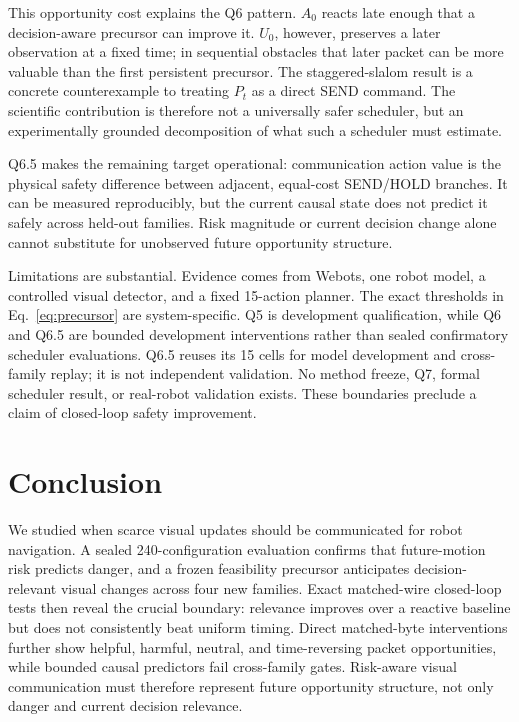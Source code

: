 \documentclass[letterpaper,10pt,conference]{ieeeconf}
\begin{document}
This opportunity cost explains the Q6 pattern. $A_0$ reacts late enough that a
decision-aware precursor can improve it. $U_0$, however, preserves a later
observation at a fixed time; in sequential obstacles that later packet can be
more valuable than the first persistent precursor. The staggered-slalom result
is a concrete counterexample to treating $P_t$ as a direct SEND command. The
scientific contribution is therefore not a universally safer scheduler, but an
experimentally grounded decomposition of what such a scheduler must estimate.

Q6.5 makes the remaining target operational: communication action value is the
physical safety difference between adjacent, equal-cost SEND/HOLD branches.
It can be measured reproducibly, but the current causal state does not predict
it safely across held-out families. Risk magnitude or current decision change
alone cannot substitute for unobserved future opportunity structure.

Limitations are substantial. Evidence comes from Webots, one robot model, a
controlled visual detector, and a fixed 15-action planner. The exact thresholds
in Eq.~\eqref{eq:precursor} are system-specific. Q5 is development
qualification, while Q6 and Q6.5 are bounded development interventions rather
than sealed confirmatory scheduler evaluations. Q6.5 reuses its 15 cells for
model development and cross-family replay; it is not independent validation.
No method freeze, Q7, formal scheduler result, or real-robot validation exists.
These boundaries preclude a claim of closed-loop safety improvement.

\section{Conclusion}

We studied when scarce visual updates should be communicated for robot
navigation. A sealed 240-configuration evaluation confirms that future-motion
risk predicts danger, and a frozen feasibility precursor anticipates
decision-relevant visual changes across four new families. Exact matched-wire
closed-loop tests then reveal the crucial boundary: relevance improves over a
reactive baseline but does not consistently beat uniform timing. Direct
matched-byte interventions further show helpful, harmful, neutral, and
time-reversing packet opportunities, while bounded causal predictors fail
cross-family gates. Risk-aware visual communication must therefore represent
future opportunity structure, not only danger and current decision relevance.



\end{document}
